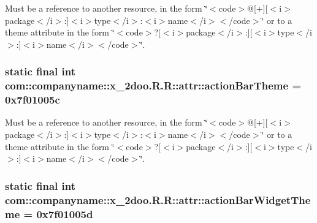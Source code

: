Must be a reference to another resource, in the form \char`\"{}$<$code$>$@\mbox{[}+\mbox{]}\mbox{[}$<$i$>$package$<$/i$>$:\mbox{]}$<$i$>$type$<$/i$>$:$<$i$>$name$<$/i$>$$<$/code$>$\char`\"{} or to a theme attribute in the form \char`\"{}$<$code$>$?\mbox{[}$<$i$>$package$<$/i$>$:\mbox{]}\mbox{[}$<$i$>$type$<$/i$>$:\mbox{]}$<$i$>$name$<$/i$>$$<$/code$>$\char`\"{}. \hypertarget{classcom_1_1companyname_1_1x__2doo_1_1_r_1_1attr_8fea81c4b86479ee4960ea3d86c7a6e4}{
\subsubsection[{actionBarTheme}]{\setlength{\rightskip}{0pt plus 5cm}static final int com::companyname::x\_\-2doo.R.R::attr::actionBarTheme = 0x7f01005c}}
\label{classcom_1_1companyname_1_1x__2doo_1_1_r_1_1attr_8fea81c4b86479ee4960ea3d86c7a6e4}


Must be a reference to another resource, in the form \char`\"{}$<$code$>$@\mbox{[}+\mbox{]}\mbox{[}$<$i$>$package$<$/i$>$:\mbox{]}$<$i$>$type$<$/i$>$:$<$i$>$name$<$/i$>$$<$/code$>$\char`\"{} or to a theme attribute in the form \char`\"{}$<$code$>$?\mbox{[}$<$i$>$package$<$/i$>$:\mbox{]}\mbox{[}$<$i$>$type$<$/i$>$:\mbox{]}$<$i$>$name$<$/i$>$$<$/code$>$\char`\"{}. \hypertarget{classcom_1_1companyname_1_1x__2doo_1_1_r_1_1attr_eb86e454ffa617b4b770d6cd4038bdbe}{
\subsubsection[{actionBarWidgetTheme}]{\setlength{\rightskip}{0pt plus 5cm}static final int com::companyname::x\_\-2doo.R.R::attr::actionBarWidgetTheme = 0x7f01005d}}
\label{classcom_1_1companyname_1_1x__2doo_1_1_r_1_1attr_eb86e454ffa617b4b770d6cd4038bdbe}


